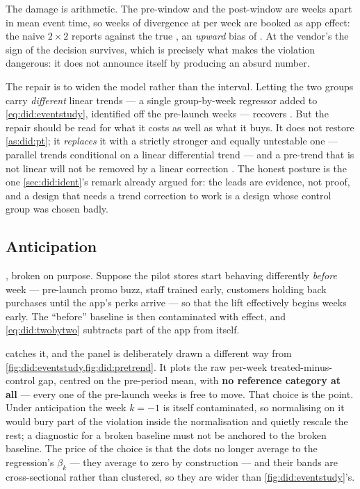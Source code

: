 The damage is arithmetic. The pre-window and the post-window are \nbEightLaunch{} weeks apart in
mean event time, so \nbEightLaunch{} weeks of divergence at \eur{\nbEightPtSlope} per week are booked
as app effect: the naive $2 \times 2$ reports \eur{\nbEightPtDid} against the true
\eur{\nbEightTrueEffect}, an \emph{upward} bias of \eur{\nbEightPtBiasAbs}. At the vendor's
\eur{\nbEightAppCost} the sign of the decision survives, which is precisely what makes the violation
dangerous: it does not announce itself by producing an absurd number.

The repair is to widen the model rather than the interval. Letting the two groups carry
\emph{different} linear trends --- a single group-by-week regressor added to
\cref{eq:did:eventstudy}, identified off the \nbEightEsNPre{} pre-launch weeks --- recovers
\eur{\nbEightPtFixed}. But the repair should be read for what it costs as well as what it buys. It
does not restore \cref{as:did:pt}; it \emph{replaces} it with a strictly stronger and equally
untestable one --- parallel trends conditional on a linear differential trend --- and a pre-trend
that is not linear will not be removed by a linear correction \citep{roth2022}. The
honest posture is the one \cref{sec:did:ident}'s remark already argued for: the leads are evidence,
not proof, and a design that needs a trend correction to work is a design whose control group was
chosen badly.

\subsection*{Anticipation}

, broken on purpose. Suppose the pilot stores start behaving differently
\emph{before} week \nbEightLaunch{} --- pre-launch promo buzz, staff trained early, customers
holding back purchases until the app's perks arrive --- so that the lift effectively begins
\nbEightAntWeeks{} weeks early. The ``before'' baseline is then contaminated with effect, and
\cref{eq:did:twobytwo} subtracts part of the app from itself.



 catches it, and the panel is deliberately drawn a different way from
\cref{fig:did:eventstudy,fig:did:pretrend}. It plots the raw per-week treated-minus-control gap,
centred on the pre-period mean, with \textbf{no reference category at all} --- every one of the
\nbEightAntNPre{} pre-launch weeks is free to move. That choice is the point. Under anticipation the
week $k = -1$ is itself contaminated, so normalising on it would bury part of the violation inside
the normalisation and quietly rescale the rest; a diagnostic for a broken baseline must not be
anchored to the broken baseline. The price of the choice is that the dots no longer average to the
regression's $\beta_k$ --- they average to zero by construction --- and their bands are
cross-sectional rather than clustered, so they are wider than \cref{fig:did:eventstudy}'s.

